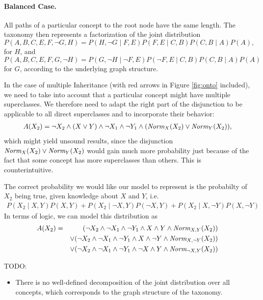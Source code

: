 \documentclass[12pt,a4paper]{article}
\begin{document}
\paragraph{Balanced Case.} All paths of a particular concept to the root node have
	the same length. The taxonomy then represents a factorization of 
	the joint distribution $$P(A,B,C,E,F,\lnot G,H)=P(H,\lnot G\mid 
	F,E)P(F,E\mid C,B)P(C,B\mid A)P(A),$$ for $H$, and 
	$$P(A,B,C,E,F,G,\lnot H)=P(G,\lnot H\mid \lnot F,E)P(\lnot 
	F,E\mid C,B)P(C,B\mid A)P(A)$$ for $G$, according to the 
	underlying graph structure.

In the case of multiple Inheritance (with red arrows in Figure \ref{fig:onto} included),
we need to take into account that a particular concept might have multiple
superclasses. We therefore need to adapt the right part of the disjunction
to be applicable to all direct superclasses and to incorporate their behavior:
\begin{eqnarray}
	A(X_2)=\lnot X_2\land (X\lor Y)\land\lnot X_1\land\lnot Y_1\land(\textit{Norm}_X(X_2)\lor\textit{Norm}_Y(X_2)),
\end{eqnarray}
which might yield unsound results, since the disjunction $\textit{Norm}_X(X_2)\lor\textit{Norm}_Y(X_2)$
would gain much more probability just because of the fact that some concept
has more superclasses than others. This is counterintuitive.

The correct probability we would like our model to represent is the probabilty
of $X_2$ being true, given knowledge about $X$ and $Y$, i.e.\
\begin{eqnarray}
	P(X_2\mid X,Y)P(X,Y) + P(X_2\mid \lnot X,Y)P(\lnot X,Y)+P(X_2\mid X,\lnot Y)P(X,\lnot Y)\nonumber
\end{eqnarray}
In terms of logic, we can model this distribution as
\begin{eqnarray}
	A(X_2)&=&(\lnot X_2\land\lnot X_1\land\lnot Y_1\land X\land Y\land\textit{Norm}_{X,Y}(X_2))\nonumber\\
	&&\lor (\lnot X_2\land\lnot X_1\land\lnot Y_1\land X\land\lnot Y\land\textit{Norm}_{X,\lnot Y}(X_2))\nonumber\\
	&&\lor (\lnot X_2\land\lnot X_1\land\lnot Y_1\land\lnot X\land Y\land\textit{Norm}_{\lnot X,Y}(X_2))\nonumber
\end{eqnarray}

TODO:
\begin{itemize}
    \item There is no well-defined decomposition of the joint distribution
    over all concepts, which corresponds to the graph structure of the taxonomy. 
\end{itemize}
\end{document}
